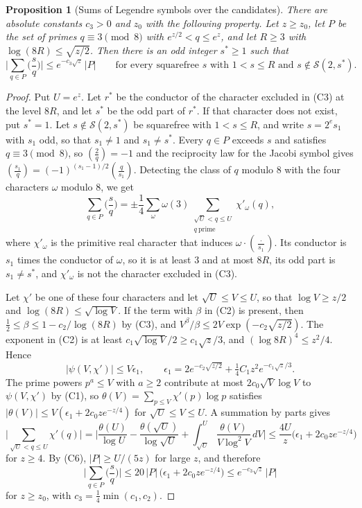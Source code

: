 \documentclass[11pt,letterpaper]{article}
\newtheorem{proposition}[theorem]{Proposition}
\numberwithin{equation}{section}
\begin{document}
\begin{proposition}[Sums of Legendre symbols over the candidates]\label{legendre}
There are absolute constants $c_3>0$ and $z_0$ with the following property. Let $z\ge z_0$, let $P$ be the set of primes $q\equiv3\pmod8$ with $e^{z/2}<q\le e^z$, and let $R\ge3$ with $\log(8R)\le\sqrt{z/2}$. Then there is an odd integer $s^\ast\ge1$ such that
\[
\Big|\sum_{q\in P}\Big(\frac sq\Big)\Big|\le e^{-c_3\sqrt z}\,|P|\qquad\text{for every squarefree }s\text{ with }1<s\le R\text{ and }s\notin\mathcal S(2,s^\ast).
\]
\end{proposition}
\begin{proof}
Put $U=e^z$. Let $r^\ast$ be the conductor of the character excluded in (C3) at the level $8R$, and let $s^\ast$ be the odd part of $r^\ast$. If that character does not exist, put $s^\ast=1$. Let $s\notin\mathcal S(2,s^\ast)$ be squarefree with $1<s\le R$, and write $s=2^es_1$ with $s_1$ odd, so that $s_1\ne1$ and $s_1\ne s^\ast$. Every $q\in P$ exceeds $s$ and satisfies $q\equiv3\pmod8$, so $(\tfrac2q)=-1$ and the reciprocity law for the Jacobi symbol gives $(\tfrac{s_1}q)=(-1)^{(s_1-1)/2}(\tfrac q{s_1})$. Detecting the class of $q$ modulo $8$ with the four characters $\omega$ modulo $8$, we get
\[
\sum_{q\in P}\Big(\frac sq\Big)=\pm\frac14\sum_{\omega}\omega(3)\sum_{\substack{\sqrt U<q\le U\\ q\ \mathrm{prime}}}\chi'_\omega(q),
\]
where $\chi'_\omega$ is the primitive real character that induces $\omega\cdot(\tfrac{\cdot}{s_1})$. Its conductor is $s_1$ times the conductor of $\omega$, so it is at least $3$ and at most $8R$, its odd part is $s_1\ne s^\ast$, and $\chi'_\omega$ is not the character excluded in (C3).

Let $\chi'$ be one of these four characters and let $\sqrt U\le V\le U$, so that $\log V\ge z/2$ and $\log(8R)\le\sqrt{\log V}$. If the term with $\beta$ in (C2) is present, then $\tfrac12\le\beta\le1-c_2/\log(8R)$ by (C3), and $V^\beta/\beta\le2V\exp(-c_2\sqrt{z/2})$. The exponent in (C2) is at least $c_1\sqrt{\log V}/2\ge c_1\sqrt z/3$, and $(\log8R)^4\le z^2/4$. Hence
\[
|\psi(V,\chi')|\le V\epsilon_1,\qquad\epsilon_1=2e^{-c_2\sqrt{z/2}}+\tfrac14C_1z^2e^{-c_1\sqrt z/3}.
\]
The prime powers $p^a\le V$ with $a\ge2$ contribute at most $2c_0\sqrt V\log V$ to $\psi(V,\chi')$ by (C1), so $\theta(V)=\sum_{p\le V}\chi'(p)\log p$ satisfies $|\theta(V)|\le V(\epsilon_1+2c_0ze^{-z/4})$ for $\sqrt U\le V\le U$. A summation by parts gives
\[
\Big|\sum_{\sqrt U<q\le U}\chi'(q)\Big|=\Big|\frac{\theta(U)}{\log U}-\frac{\theta(\sqrt U)}{\log\sqrt U}+\int_{\sqrt U}^U\frac{\theta(V)}{V\log^2V}\,dV\Big|\le\frac{4U}z\big(\epsilon_1+2c_0ze^{-z/4}\big)
\]
for $z\ge4$. By (C6), $|P|\ge U/(5z)$ for large $z$, and therefore
\[
\Big|\sum_{q\in P}\Big(\frac sq\Big)\Big|\le20\,|P|\,\big(\epsilon_1+2c_0ze^{-z/4}\big)\le e^{-c_3\sqrt z}\,|P|
\]
for $z\ge z_0$, with $c_3=\tfrac14\min(c_1,c_2)$.
\end{proof}
\end{document}
